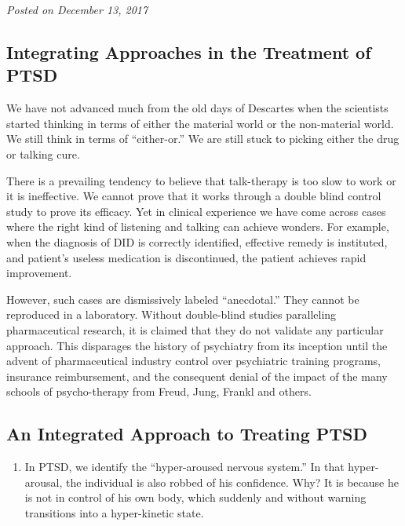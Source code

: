 \documentclass[]{book}
\providecommand{\tightlist}{%
  \setlength{\itemsep}{0pt}\setlength{\parskip}{0pt}}
\begin{document}
\emph{Posted on December 13, 2017}

\hypertarget{integrating-approaches-in-the-treatment-of-ptsd}{%
\subsection*{Integrating Approaches in the Treatment of PTSD}\label{integrating-approaches-in-the-treatment-of-ptsd}}

We have not advanced much from the old days of Descartes when the scientists started thinking in terms of either the material world or the non-material world. We still think in terms of ``either-or.'' We are still stuck to picking either the drug or talking cure.

There is a prevailing tendency to believe that talk-therapy is too slow to work or it is ineffective. We cannot prove that it works through a double blind control study to prove its efficacy. Yet in clinical experience we have come across cases where the right kind of listening and talking can achieve wonders. For example, when the diagnosis of DID is correctly identified, effective remedy is instituted, and patient's useless medication is discontinued, the patient achieves rapid improvement.

However, such cases are dismissively labeled ``anecdotal.'' They cannot be reproduced in a laboratory. Without double-blind studies paralleling pharmaceutical research, it is claimed that they do not validate any particular approach. This disparages the history of psychiatry from its inception until the advent of pharmaceutical industry control over psychiatric training programs, insurance reimbursement, and the consequent denial of the impact of the many schools of psycho-therapy from Freud, Jung, Frankl and others.

\hypertarget{an-integrated-approach-to-treating-ptsd}{%
\subsection*{An Integrated Approach to Treating PTSD}\label{an-integrated-approach-to-treating-ptsd}}

\begin{enumerate}
\def\labelenumi{\arabic{enumi}.}
\tightlist
\item
  In PTSD, we identify the ``hyper-aroused nervous system.'' In that hyper-arousal, the individual is also robbed of his confidence. Why? It is because he is not in control of his own body, which suddenly and without warning transitions into a hyper-kinetic state.
\end{enumerate}
\end{document}
